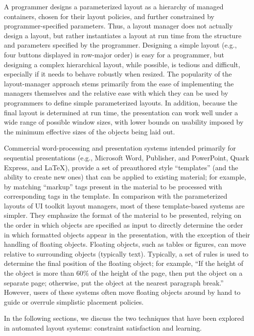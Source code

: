     A programmer designs a parameterized layout as a hierarchy of managed
    containers, chosen for their layout policies, and further constrained by
    programmer-specified parameters. Thus, a layout manager does not actually
    design a layout, but rather instantiates a layout at run time from the
    structure and parameters specified by the programmer. Designing a simple
    layout (e.g., four buttons displayed in row-major order) is easy for a
    programmer, but designing a complex hierarchical layout, while possible, is
    tedious and difficult, especially if it needs to behave robustly when
    resized. The popularity of the layout-manager approach stems primarily from
    the ease of implementing the managers themselves and the relative ease with
    which they can be used by programmers to define simple parameterized
    layouts. In addition, because the final layout is determined at run time,
    the presentation can work well under a wide range of possible window sizes,
    with lower bounds on usability imposed by the minimum effective sizes of
    the objects being laid out.

    Commercial word-processing and presentation systems intended primarily for
    sequential presentations (e.g., Microsoft Word, Publisher, and PowerPoint,
    Quark Express, and LaTeX), provide a set of preauthored style “templates”
    (and the ability to create new ones) that can be applied to existing
    material; for example, by matching “markup” tags present in the material to
    be processed with corresponding tags in the template. In comparison with
    the parameterized layouts of UI toolkit layout managers, most of these
    template-based systems are simpler. They emphasize the format of the
    material to be presented, relying on the order in which objects are
    specified as input to directly determine the order in which formatted
    objects appear in the presentation, with the exception of their handling of
    floating objects. Floating objects, such as tables or figures, can move
    relative to surrounding objects (typically text). Typically, a set of rules
    is used to determine the final position of the floating object; for
    example, “If the height of the object is more than 60\% of the height of
    the page, then put the object on a separate page; otherwise, put the object
    at the nearest paragraph break.” However, users of these systems often move
    floating objects around by hand to guide or overrule simplistic placement
    policies.

    In the following sections, we discuss the two techniques that have been
    explored in automated layout systems: constraint satisfaction and learning.

